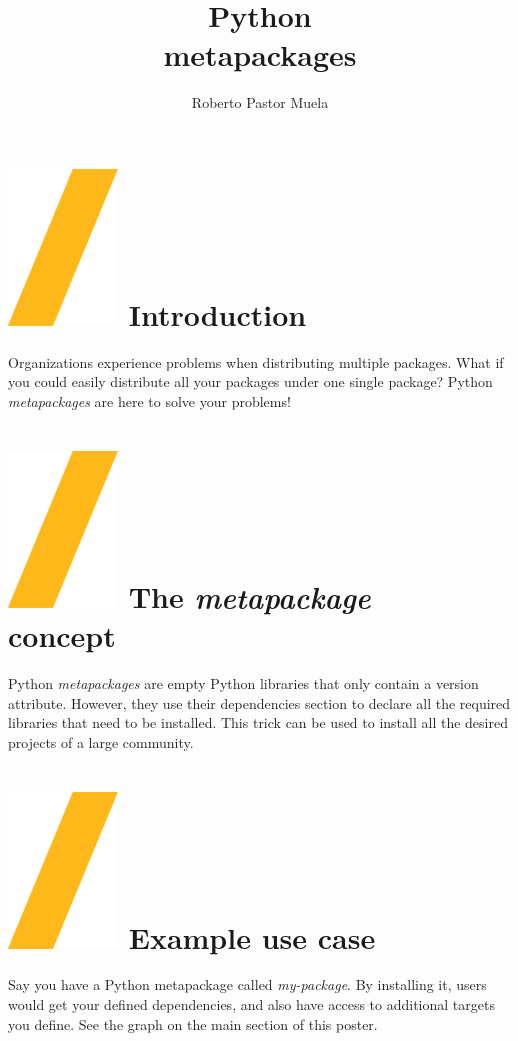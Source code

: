 \documentclass[a0paper,fleqn]{src/betterposter}
\begin{document}
{{}

}{

\title{Python \\metapackages}
\author{Roberto Pastor Muela}

\section{\includegraphics[height=\fontcharht\font`\S]{img/general/slash.png} Introduction}
Organizations experience problems when distributing multiple packages. What if you could easily distribute
all your packages under one single package? Python \textit{metapackages} are here to solve your problems!

\section{\includegraphics[height=\fontcharht\font`\S]{img/general/slash.png} The \textit{metapackage}\\concept}
Python \textit{metapackages} are empty Python libraries that only contain a version attribute.
However, they use their dependencies section to declare all the required libraries that need
to be installed. This trick can be used to install all the desired projects of a large community.

\section{\includegraphics[height=\fontcharht\font`\S]{img/general/slash.png} Example use case}
Say you have a Python metapackage called \textit{my-package}. By installing it, users would get your
defined dependencies, and also have access to additional targets you define. See the graph on the main
section of this poster.

}
\end{document}
